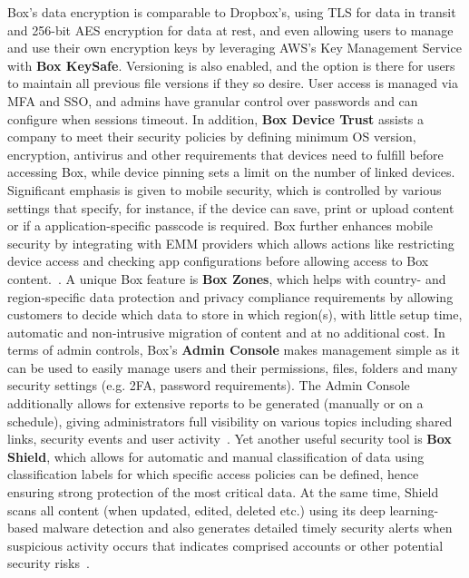 Box's data encryption is comparable to Dropbox's, using TLS for data in transit and 256-bit AES encryption for data at rest, and even allowing users to manage and use their own encryption keys by leveraging AWS's Key Management Service with \textbf{Box KeySafe}. Versioning is also enabled, and the option is there for users to maintain all previous file versions if they so desire. User access is managed via MFA and SSO, and admins have granular control over passwords and can configure when sessions timeout. In addition, \textbf{Box Device Trust}  assists a company to meet their security policies by defining minimum OS version, encryption, antivirus and other requirements that devices need to fulfill before accessing Box, while device pinning sets a limit on the number of linked devices. Significant emphasis is given to mobile security, which is controlled by various settings that specify, for instance, if the device can save, print or upload content or if a application-specific passcode is required. Box further enhances mobile security by integrating with EMM providers which allows actions like restricting device access and checking app configurations before allowing access to Box content.~\cite{box_mobile,box_emm}. A unique Box feature is \textbf{Box Zones}, which helps with country- and region-specific data protection and privacy compliance requirements by allowing customers to decide which data to store in which region(s), with little setup time, automatic and non-intrusive migration of content and at no additional cost. In terms of admin controls, Box's \textbf{Admin Console} makes management simple as it can be used to easily manage users and their permissions, files, folders and many security settings (e.g. 2FA, password requirements). The Admin Console additionally  allows for extensive reports to be generated (manually or on a schedule), giving administrators full visibility on various topics including shared links, security events and user activity~\cite{box_admin}. Yet another useful security tool is \textbf{Box Shield}, which allows for automatic and manual classification of data using classification labels for which specific access policies can be defined, hence ensuring strong protection of the most critical data. At the same time, Shield scans all content (when updated, edited, deleted etc.) using its deep learning-based malware detection and also generates detailed timely security alerts when suspicious activity occurs that indicates comprised accounts or other potential security risks~\cite{box}.

